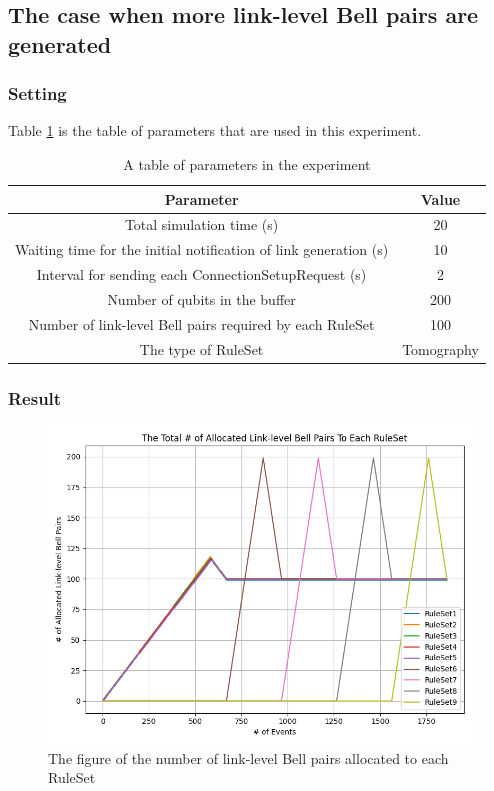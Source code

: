 \newpage

\subsection{The case when more link-level Bell pairs are generated}

\subsubsection{Setting}
Table \ref{table:parameter-for-experiment3} is the table of parameters that are used in this experiment.

\begin{table}[ht]
  \begin{center}
    \begin{tabular}{|c|c|} 
      \hline
      Parameter & Value \\ \hline \cline{1-2}
      Total simulation time (s) &  20 \\ \cline{1-2}
      Waiting time for the initial notification of link generation (s) &  10 \\ \cline{1-2} 
      Interval for sending each ConnectionSetupRequest (s) &  2 \\ \cline{1-2} 
      Number of qubits in the buffer & 200  \\  \cline{1-2}
      Number of link-level Bell pairs required by each RuleSet &  100 \\ \cline{1-2}
      The type of RuleSet & Tomography \\  \hline  \cline{1-2}
    \end{tabular}
    \caption{A table of parameters in the experiment}
    \label{table:parameter-for-experiment3}
  \end{center}
\end{table}

\subsubsection{Result}
\begin{figure}[H]
  \centerline{\includegraphics[width=.6\columnwidth]{images/result3.png}}
  \caption{The figure of the number of link-level Bell pairs allocated to each RuleSet}
  \label{fig:result3}
\end{figure}


